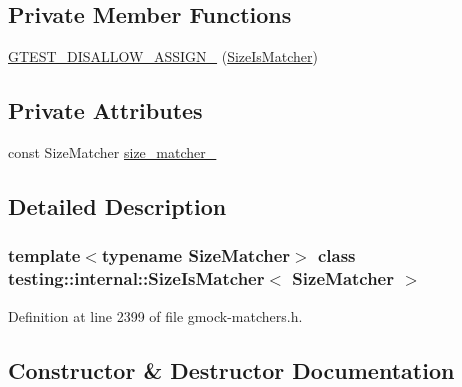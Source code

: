 \subsection*{Private Member Functions}
\begin{DoxyCompactItemize}
\item 
\hyperlink{classtesting_1_1internal_1_1SizeIsMatcher_a986a0ee808657d0d86684ad2b4edb89f}{G\+T\+E\+S\+T\+\_\+\+D\+I\+S\+A\+L\+L\+O\+W\+\_\+\+A\+S\+S\+I\+G\+N\+\_\+} (\hyperlink{classtesting_1_1internal_1_1SizeIsMatcher}{Size\+Is\+Matcher})
\end{DoxyCompactItemize}
\subsection*{Private Attributes}
\begin{DoxyCompactItemize}
\item 
const Size\+Matcher \hyperlink{classtesting_1_1internal_1_1SizeIsMatcher_aa5a60a11ee3fb9021024e0306cf2a2a0}{size\+\_\+matcher\+\_\+}
\end{DoxyCompactItemize}


\subsection{Detailed Description}
\subsubsection*{template$<$typename Size\+Matcher$>$\newline
class testing\+::internal\+::\+Size\+Is\+Matcher$<$ Size\+Matcher $>$}



Definition at line 2399 of file gmock-\/matchers.\+h.



\subsection{Constructor \& Destructor Documentation}
\mbox{\label{classtesting_1_1internal_1_1SizeIsMatcher_ab6a4e770fe9c1f6d07ef8bf0bc996d5d}} 
